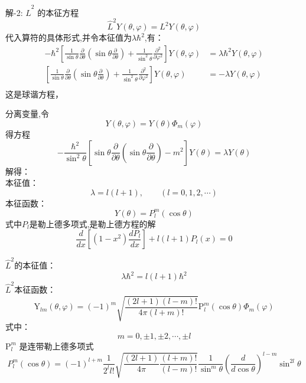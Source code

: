 \begin{frame} 
    \alert{解-2:} $\hat{L}^2$ 的本征方程
    $$\hat{L}^2Y(\theta,\varphi)=L^2 Y(\theta,\varphi)$$
    代入算符的具体形式,并令本征值为$\lambda\hbar^2$,有：
    \begin{equation*}
        \begin{split}
            -\hbar^{2}\left[\frac{1}{\sin \theta} \frac{\partial}{\partial \theta}\left(\sin \theta \frac{\partial}{\partial \theta}\right)+\frac{1}{\sin ^{2} \theta} \frac{\partial^{2}}{\partial \varphi^{2}}\right] Y(\theta,\varphi)&=\lambda\hbar^2 Y(\theta,\varphi) \\
            \left[\frac{1}{\sin \theta} \frac{\partial}{\partial \theta}\left(\sin \theta \frac{\partial}{\partial \theta}\right)+\frac{1}{\sin ^{2} \theta} \frac{\partial^{2}}{\partial \varphi^{2}}\right] Y(\theta,\varphi)&=-\lambda Y(\theta,\varphi) \\
        \end{split} 
    \end{equation*}
    这是球谐方程，
\end{frame} 

\begin{frame} 
    分离变量,令 
    \[ Y(\theta,\varphi)= Y(\theta)\Phi_m(\varphi)\]
    得方程
    \begin{equation}
        -\frac{\hbar^{2}}{\sin ^{2} \theta}\left[\sin \theta \frac{\partial}{\partial \theta} \left(\sin \theta \frac{\partial}{\partial \theta}\right)-m^{2}\right] Y(\theta)=\lambda Y(\theta)
    \end{equation}
    解得：\\
    本征值： $$\lambda=l(l+1), \qquad (l= 0,1,2,\cdots)$$ 
    本征函数：$$Y(\theta)=P_{l} ^m(\cos \theta)$$
    式中$P_{l}$是勒上德多项式,是勒上德方程的解 
    \begin{equation}
        \frac{d}{d x}\left[\left(1-x^{2}\right) \frac{d P_{l}}{d x}\right]+l(l+1) P_{l}(x)=0 
    \end{equation}
\end{frame} 

\begin{frame} 
    $\hat{L}^2$的本征值：$$\lambda\hbar^2=l(l+1)\hbar^2$$
    $\hat{L}^2$本征函数：
    $$
    \mathrm{Y}_{l m}(\theta, \varphi)=(-1)^{m} \sqrt{\frac{(2 l+1)(l-m) !}{4 \pi(l+m) !}} \mathrm{P}_{l}^{m}(\cos \theta) \Phi_{m}(\varphi)
    $$ 
    式中：
    $$ m=0,\pm 1,  \pm 2, \cdots, \pm l  $$
    $\mathrm{P}_{l}^{m} $ 是连带勒上德多项式
    $$
    P_{l}^{m}(\cos \theta)=(-1)^{l+m} \frac{1}{2^{l} l !} \sqrt{\frac{(2 l+1)}{4 \pi} \frac{(l+m) !}{(l-m) !} } \frac{1}{\sin ^{m} \theta}\left(\frac{d}{d \cos \theta}\right)^{l-m} \sin ^{2 l} \theta
    $$
\end{frame} 

